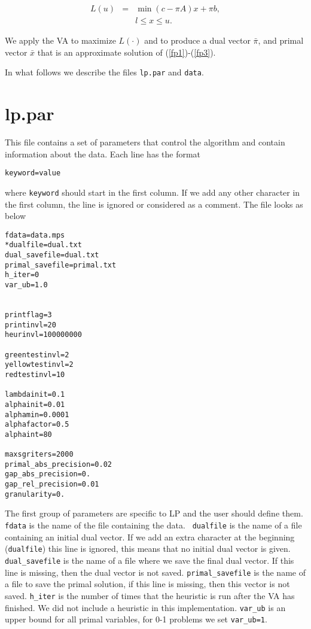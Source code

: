 \documentclass{article}
\begin{document}
\begin{eqnarray*}
L(u) & = & \min (c-\pi A) x + \pi b, \\
&&l \leq x \le u.
\end{eqnarray*}

We apply the VA to maximize $L(\cdot)$ and to produce a
dual vector $\bar \pi$, and
primal vector $\bar x$ that is an approximate solution of
(\ref{fp1})-(\ref{fp3}).

In what follows we describe the files {\tt lp.par} and
{\tt data}.


\section{lp.par}

This file contains a set of parameters that control the algorithm and contain
information about the data. Each line has the format

{\tt keyword=value}

\noindent where {\tt keyword} should start in the first column. If we add any
other character in the first column, the line is ignored or considered as a
comment. The file looks as below

\bigskip
\begin{verbatim}
fdata=data.mps
*dualfile=dual.txt
dual_savefile=dual.txt
primal_savefile=primal.txt
h_iter=0
var_ub=1.0


printflag=3
printinvl=20
heurinvl=100000000

greentestinvl=2
yellowtestinvl=2
redtestinvl=10

lambdainit=0.1
alphainit=0.01
alphamin=0.0001
alphafactor=0.5
alphaint=80

maxsgriters=2000
primal_abs_precision=0.02
gap_abs_precision=0.
gap_rel_precision=0.01
granularity=0.

\end{verbatim}

The first group of parameters are specific to LP and the user should
define them. {\tt fdata} is the name of the file containing the data. {\tt
dualfile} is the name of a file containing an initial dual vector. If we add
an extra character at the beginning ({\tt *dualfile}) this line is ignored,
this means that no initial dual vector is given. {\tt dual\_savefile} is the
name of a file where we save the final dual vector. If this line is missing,
then the dual vector is not saved. {\tt primal\_savefile} is the name of a file
to save the primal solution, if this
line is missing, then this vector is not saved. {\tt h\_iter} is the number of
times that the heuristic is run after the VA has finished. We did not include 
a heuristic in this implementation. {\tt var\_ub} is an upper bound
for all primal variables, for 0-1 problems we set {\tt var\_ub=1}.
\end{document}
